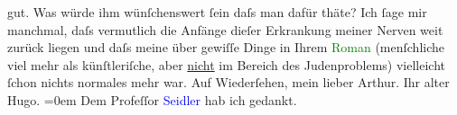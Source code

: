                gut. Was würde ihm wünſchens{\pb}wert
               ſein daſs man dafür thäte? \pend
           \pstart
           Ich ſage mir manchmal, daſs vermutlich die Anfänge dieſer Erkrankung meiner Nerven
               weit zurück liegen und daſs meine \label{K_L01808_2v}\label{K_L01808_2h}
               über gewiſſe Dinge in Ihrem \textcolor{green}{Roman}{}
               (menſchliche viel mehr als künſtleriſche, aber \uline{nicht}
               im Bereich des Judenproblems) {\pb}vielleicht ſchon nichts normales mehr war.\pend
           \pstart
           Auf Wiederſehen, mein lieber Arthur.\pend
           \pstart
           Ihr alter{\\[\baselineskip]}\spacefill\mbox{Hugo.}\pend
           \leftskip=0em{}\pstart
           \noindent{}Dem Profeſſor \textcolor{blue}{Seidler}{}\ledrightnote{\textcolor{blue}{Gustav Seidler}} hab ich gedankt.\pend
           \endnumbering{}  
      